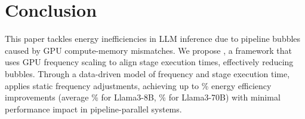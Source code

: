 \section{Conclusion}
\label{sec:conclusion}

This paper tackles energy inefficiencies in LLM inference due to pipeline bubbles caused by GPU compute-memory mismatches.
We propose \thisproj{}, a framework that uses GPU frequency scaling to align stage execution times, effectively reducing bubbles.
Through a data-driven model of frequency and stage execution time, \thisproj{} applies static frequency adjustments, achieving up to \% energy efficiency improvements (average \% for Llama3-8B, \% for Llama3-70B) with minimal performance impact in pipeline-parallel systems.


